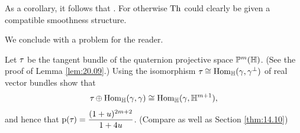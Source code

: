 \documentclass[../main]{subfiles}
\begin{document}

As a corollary, it follows that . For otherwise $\operatorname{Th}$ could clearly be given a compatible smoothness structure.

We conclude with a problem for the reader.

\begin{problem}\label{prob:20.A} Let $\tau_{}$ be the tangent bundle of the quaternion projective space $\mathbb{P}^{m}(\mathbb{H})$. (See the proof of Lemma \ref{lem:20.09}.) Using the isomorphism $\tau_{} \cong \operatorname{Hom}_{\mathbb{H}}(\gamma, \gamma^{\perp})$ of real vector bundles show that
\[
\tau_{} \oplus \operatorname{Hom}_{\mathbb{H}}(\gamma, \gamma) \cong \operatorname{Hom}_{\mathbb{H}}(\gamma, \mathbb{H}^{m+1}),
\]
and hence that $\operatorname{p}(\tau_{})=\dfrac{(1+u)^{2 m+2} }{1+4 u}$. (Compare \cite{szczarba} as well as Section \ref{thm:14.10})

\end{problem}
\end{document}
